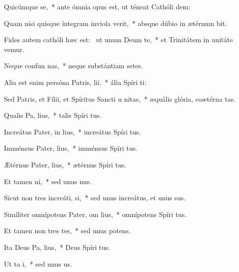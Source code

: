 \item Quicúmque   se,~* ante ómnia opus est, ut téneat Cathóli dem:
\item Quam nisi quisque íntegram inviola verit,~* absque dúbio in ætérnum bit.
\item Fides autem cathóli hæc est:~\pscross{} ut unum Deum  te,~* et Trinitátem in unitáte vemur.
\item Neque confun nas,~* neque substántiam setes.
\item Alia est enim persóna Patris,  lii,~* ália Spíri ti:
\item Sed Patris, et Fílii, et Spíritus Sancti u  nitas,~* æquális glória, coætérna tas.
\item Qualis Pa,  lius,~* talis Spíri tus.
\item Increátus Pater, in lius,~* increátus Spíri tus.
\item Imménsus Pater,  lius,~* imménsus Spíri tus.
\item Ætérnus Pater,  lius,~* ætérnus Spíri tus.
\item Et tamen   ni,~* sed unus nus.
\item Sicut non tres increáti,   si,~* sed unus increátus, et unus sus.
\item Simíliter omnípotens Pater, om lius,~* omnípotens Spíri tus.
\item Et tamen non tres tes,~* sed unus potens.
\item Ita Deus Pa,  lius,~* Deus Spíri tus.
\item Ut ta   i,~* sed unus  us.
